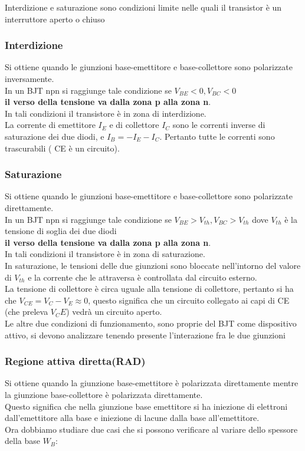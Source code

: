 Interdizione e saturazione sono condizioni limite nelle quali il transistor è un interruttore aperto o chiuso

\subsubsection{Interdizione}
Si ottiene quando le giunzioni base-emettitore e base-collettore sono polarizzate inversamente.\\
In un BJT npn si raggiunge tale condizione se $V_{BE}<0, V_{BC}<0$\\
\textbf{il verso della tensione va dalla zona p alla zona n}.\\
In tali condizioni il transistore è in zona di interdizione.\\
La corrente di emettitore $I_E$ e di collettore $I_C$ sono le correnti inverse di saturazione dei due diodi, e $I_B = - I_E- I_C$. Pertanto tutte le correnti sono trascurabili ( CE è un circuito).

\subsubsection{Saturazione}
Si ottiene quando le giunzioni base-emettitore e base-collettore sono polarizzate direttamente.\\
In un BJT npn si raggiunge tale condizione se $V_{BE}>V_{th}, V_{BC}>V_{th}$ dove $V_{th}$ è la tensione di soglia dei due diodi\\
\textbf{il verso della tensione va dalla zona p alla zona n}.\\
In tali condizioni il transistore è in zona di saturazione.\\
In saturazione, le tensioni delle due giunzioni sono bloccate nell'intorno del valore di $V_{th}$ e la corrente che le attraversa è controllata dal circuito esterno.\\
La tensione di collettore è circa uguale alla tensione di collettore, pertanto si ha che $V_{CE}=V_{C}-V_{E} \approx 0$, questo significa che un circuito collegato ai capi di CE (che preleva $V_CE$) vedrà un circuito aperto.\\

Le altre due condizioni di funzionamento, sono proprie del BJT come dispositivo attivo, si devono analizzare tenendo presente l'interazione fra le due giunzioni

\subsubsection{Regione attiva diretta(RAD)}
Si ottiene quando la giunzione base-emettitore è polarizzata direttamente mentre la giunzione base-collettore è polarizzata direttamente.\\
Questo significa che nella giunzione base emettitore si ha iniezione di elettroni dall'emettitore alla base e iniezione di lacune dalla base all'emettitore.\\
Ora dobbiamo studiare due casi che si possono verificare al variare dello spessore della base $W_B$:\\

